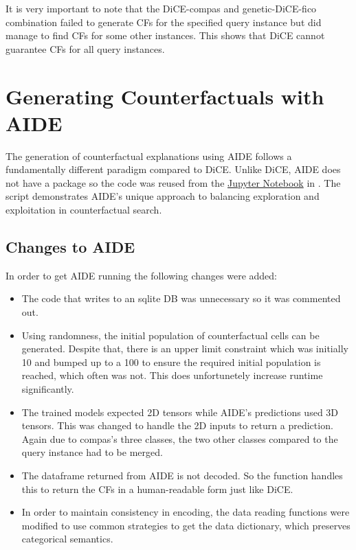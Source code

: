 It is very important to note that the DiCE-compas and genetic-DiCE-fico combination failed to generate CFs for the specified query instance but did manage to find CFs for some other instances. This shows that DiCE cannot guarantee CFs for all query instances. 

\section{Generating Counterfactuals with AIDE}
The generation of counterfactual explanations using AIDE follows a fundamentally different paradigm compared to DiCE. Unlike DiCE, AIDE does not have a package so the code was reused from the \href{https://github.com/ColonelPride/AIDE_notebook/tree/master}{Jupyter Notebook} in \citet{forrest2021contrastive}. The script  demonstrates AIDE's unique approach to balancing exploration and exploitation in counterfactual search.

\subsection{Changes to AIDE}
In order to get AIDE running the following changes were added:

\begin{itemize}
    \item The code that writes to an sqlite DB was unnecessary so it was commented out.
    \item Using randomness, the initial population of counterfactual cells can be generated. Despite that, there is an upper limit constraint which was initially 10 and bumped up to a 100 to ensure the required initial population is reached, which often was not. This does unfortunetely increase runtime significantly.
    \item The trained models expected 2D tensors  while AIDE's predictions used 3D tensors. This was changed to handle the 2D inputs to return a prediction. Again due to compas's three classes, the two other classes compared to the query instance had to be merged.
    \item The dataframe returned from AIDE is not decoded. So the  function handles this to return the CFs in a human-readable form just like DiCE.
    \item In order to maintain consistency in encoding, the data reading functions were modified to use common  strategies to get the data dictionary, which preserves categorical semantics.
\end{itemize}


